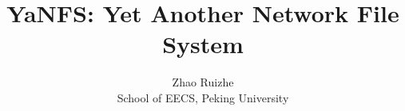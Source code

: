 \title{YaNFS: Yet Another Network File System}
\author{Zhao Ruizhe\\
		School of EECS, Peking University}
\date{}
\maketitle